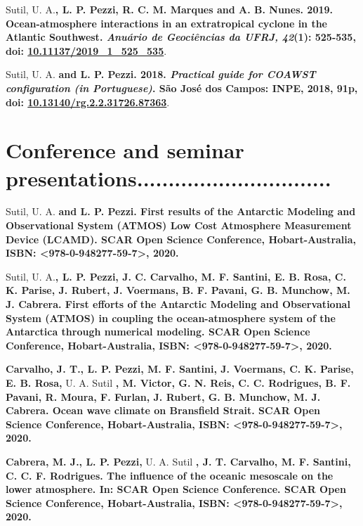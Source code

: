 \documentclass[letterpaper]{twentysecondcv} %
\begin{document}
Sutil, U. A.\textbf{, L. P. Pezzi, R. C. M. Marques and A. B. Nunes. 2019. Ocean-atmosphere interactions in an extratropical cyclone in the Atlantic Southwest. \textit{Anuário de Geociências da UFRJ, 42}(1): 525-535, doi: \textcolor{mainblue}{\href{http://dx.doi.org/10.11137/2019_1_525_535}{10.11137/2019\_1\_525\_535}}}.

\newpage
\makeprofile
Sutil, U. A.\textbf{ and L. P. Pezzi. 2018. \textit{Practical guide for COAWST configuration (in Portuguese)}. São José dos Campos: INPE, 2018, 91p, doi: \textcolor{mainblue}{\href{https://doi.org/10.13140/rg.2.2.31726.87363}{10.13140/rg.2.2.31726.87363}}}.

\bigskip
\section{Conference and seminar presentations\textcolor{maingray}{...............................}}

Sutil, U. A.\textbf{ and L. P. Pezzi.  First results of the Antarctic Modeling and Observational System (ATMOS) Low Cost Atmosphere Measurement Device (LCAMD). SCAR Open Science Conference, Hobart-Australia, ISBN: <978-0-948277-59-7>, 2020.}

Sutil, U. A.\textbf{, L. P. Pezzi, J. C. Carvalho, M. F. Santini, E. B. Rosa, C. K. Parise, J. Rubert, J. Voermans, B. F. Pavani, G. B. Munchow, M. J. Cabrera. First efforts of the Antarctic Modeling and Observational System (ATMOS) in coupling the ocean-atmosphere system of the Antarctica through numerical modeling. SCAR Open Science Conference, Hobart-Australia, ISBN: <978-0-948277-59-7>, 2020.}

\textbf{Carvalho, J. T., L. P. Pezzi, M. F. Santini, J. Voermans, C. K. Parise, E. B. Rosa,} U. A. Sutil \textbf{, M. Victor, G. N. Reis, C. C. Rodrigues, B. F. Pavani, R. Moura, F. Furlan, J. Rubert, G. B. Munchow, M. J. Cabrera}\textbf{. Ocean wave climate on Bransfield Strait. SCAR Open Science Conference, Hobart-Australia, ISBN: <978-0-948277-59-7>, 2020.} 

\textbf{Cabrera, M. J., L. P. Pezzi,} U. A. Sutil \textbf{, J. T. Carvalho, M. F. Santini, C. C. F. Rodrigues}\textbf{. The influence of the oceanic mesoscale on the lower atmosphere. In: SCAR Open Science Conference. SCAR Open Science Conference, Hobart-Australia, ISBN: <978-0-948277-59-7>, 2020.} 
\end{document}
